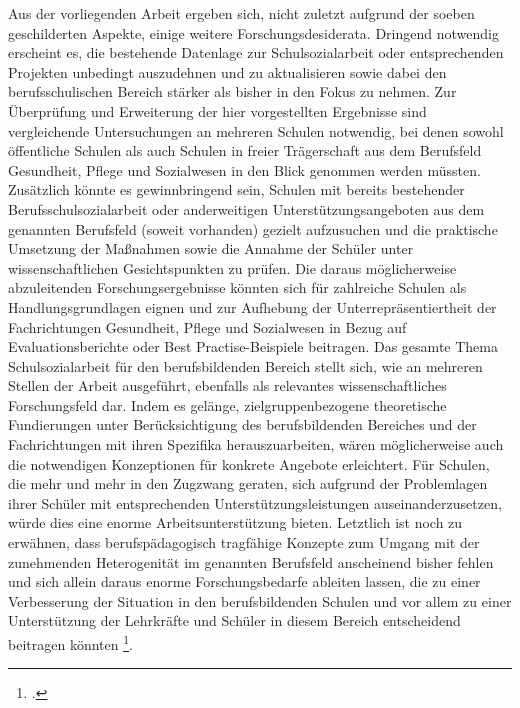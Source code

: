 Aus der vorliegenden Arbeit ergeben sich, nicht zuletzt aufgrund der soeben geschilderten Aspekte, einige weitere Forschungsdesiderata. Dringend notwendig erscheint es, die bestehende Datenlage zur Schulsozialarbeit oder entsprechenden Projekten unbedingt auszudehnen und zu aktualisieren sowie dabei den berufsschulischen Bereich stärker als bisher in den Fokus zu nehmen. Zur Überprüfung und Erweiterung der hier vorgestellten Ergebnisse sind vergleichende Untersuchungen an mehreren Schulen notwendig, bei denen sowohl öffentliche Schulen als auch Schulen in freier Trägerschaft aus dem Berufsfeld Gesundheit, Pflege und Sozialwesen in den Blick genommen werden müssten. Zusätzlich könnte es gewinnbringend sein, Schulen mit bereits bestehender Berufsschulsozialarbeit oder anderweitigen Unterstützungsangeboten aus dem genannten Berufsfeld (soweit vorhanden) gezielt aufzusuchen und die praktische Umsetzung der Maßnahmen sowie die Annahme der Schüler unter wissenschaftlichen Gesichtspunkten zu prüfen. Die daraus möglicherweise abzuleitenden Forschungsergebnisse könnten sich für zahlreiche Schulen als Handlungsgrundlagen eignen und zur Aufhebung der Unterrepräsentiertheit der Fachrichtungen Gesundheit, Pflege und Sozialwesen in Bezug auf Evaluationsberichte oder Best Practise-Beispiele beitragen. Das gesamte Thema Schulsozialarbeit für den berufsbildenden Bereich stellt sich, wie an mehreren Stellen der Arbeit ausgeführt, ebenfalls als relevantes wissenschaftliches Forschungsfeld dar. Indem es gelänge, zielgruppenbezogene theoretische Fundierungen unter Berücksichtigung des berufsbildenden Bereiches und der Fachrichtungen mit ihren Spezifika herauszuarbeiten, wären möglicherweise auch die notwendigen Konzeptionen für konkrete Angebote erleichtert. Für Schulen, die mehr und mehr in den Zugzwang geraten, sich aufgrund der Problemlagen ihrer Schüler mit entsprechenden Unterstützungsleistungen auseinanderzusetzen, würde dies eine enorme Arbeitsunterstützung bieten. Letztlich ist noch zu erwähnen, dass berufspädagogisch tragfähige Konzepte zum Umgang mit der zunehmenden Heterogenität im genannten Berufsfeld anscheinend bisher fehlen und sich allein daraus enorme Forschungsbedarfe ableiten lassen, die zu einer Verbesserung der Situation in den berufsbildenden Schulen und vor allem zu einer Unterstützung der Lehrkräfte und Schüler in diesem Bereich entscheidend beitragen könnten \footcite[vgl.][23ff]{Grassi2012}.
 
